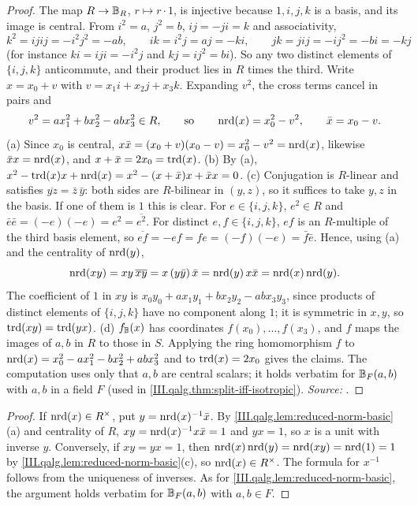 \begin{lemma}
\end{lemma}
\begin{proof}
The map $R\to\mathbb{B}_R$, $r\mapsto r\cdot1$, is injective because $1,i,j,k$ is a basis, and its image is central. From $i^2=a$, $j^2=b$, $ij=-ji=k$
and associativity,
\[
  k^2=ijij=-i^2j^2=-ab,\qquad ik=i^2j=aj=-ki,\qquad jk=jij=-ij^2=-bi=-kj
\]
(for instance $ki=iji=-i^2j$ and $kj=ij^2=bi$). So any two distinct elements of $\{i,j,k\}$ anticommute, and their product lies in $R$ times the third.
Write $x=x_0+v$ with $v=x_1i+x_2j+x_3k$. Expanding $v^2$, the cross terms cancel in pairs and
\[
  v^2=ax_1^2+bx_2^2-abx_3^2\in R,\qquad\text{so}\qquad \operatorname{nrd}(x)=x_0^2-v^2,\qquad \bar x=x_0-v .
\]
(a) Since $x_0$ is central, $x\bar x=(x_0+v)(x_0-v)=x_0^2-v^2=\operatorname{nrd}(x)$, likewise $\bar xx=\operatorname{nrd}(x)$, and $x+\bar x=2x_0=\operatorname{trd}(x)$.
(b) By (a), $x^2-\operatorname{trd}(x)x+\operatorname{nrd}(x)=x^2-(x+\bar x)x+\bar xx=0$.
(c) Conjugation is $R$-linear and satisfies $\overline{yz}=\bar z\,\bar y$: both sides are $R$-bilinear in $(y,z)$, so it suffices to take $y,z$ in
the basis. If one of them is $1$ this is clear. For $e\in\{i,j,k\}$, $e^2\in R$ and $\bar e\bar e=(-e)(-e)=e^2=\overline{e^2}$. For distinct
$e,f\in\{i,j,k\}$, $ef$ is an $R$-multiple of the third basis element, so $\overline{ef}=-ef=fe=(-f)(-e)=\bar f\bar e$. Hence, using (a) and the
centrality of $\operatorname{nrd}(y)$,
\[
  \operatorname{nrd}(xy)=xy\,\overline{xy}=x\,(y\bar y)\,\bar x=\operatorname{nrd}(y)\,x\bar x=\operatorname{nrd}(x)\operatorname{nrd}(y).
\]
The coefficient of $1$ in $xy$ is $x_0y_0+ax_1y_1+bx_2y_2-abx_3y_3$, since products of distinct elements of $\{i,j,k\}$ have no component along
$1$; it is symmetric in $x,y$, so $\operatorname{trd}(xy)=\operatorname{trd}(yx)$.
(d) $f_{\mathbb{B}}(x)$ has coordinates $f(x_0),\dots,f(x_3)$, and $f$ maps the images of $a,b$ in $R$ to those in $S$. Applying the ring
homomorphism $f$ to $\operatorname{nrd}(x)=x_0^2-ax_1^2-bx_2^2+abx_3^2$ and to $\operatorname{trd}(x)=2x_0$ gives the claims.
The computation uses only that $a,b$ are central scalars; it holds verbatim for $\mathbb{B}_F(a,b)$ with $a,b$ in a field $F$ (used in
\cref{III.qalg.thm:split-iff-isotropic}). \emph{Source:} \cite[§3.3]{Voi}.
\end{proof}

\begin{lemma}[units]
\end{lemma}
\begin{proof}
If $\operatorname{nrd}(x)\in R^\times$, put $y=\operatorname{nrd}(x)^{-1}\bar x$. By \cref{III.qalg.lem:reduced-norm-basic}(a) and centrality of $R$, $xy=\operatorname{nrd}(x)^{-1}x\bar x=1$
and $yx=1$, so $x$ is a unit with inverse $y$. Conversely, if $xy=yx=1$, then $\operatorname{nrd}(x)\operatorname{nrd}(y)=\operatorname{nrd}(xy)=\operatorname{nrd}(1)=1$ by
\cref{III.qalg.lem:reduced-norm-basic}(c), so $\operatorname{nrd}(x)\in R^\times$. The formula for $x^{-1}$ follows from the uniqueness of inverses. As for
\cref{III.qalg.lem:reduced-norm-basic}, the argument holds verbatim for $\mathbb{B}_F(a,b)$ with $a,b\in F$.
\end{proof}

